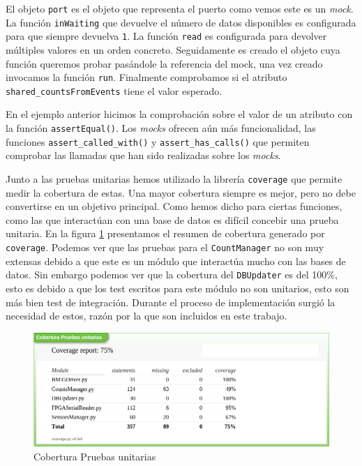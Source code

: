 	\par
	El objeto \texttt{port} es el objeto que representa el puerto como vemos este es un \emph{mock}. La función \texttt{inWaiting} que devuelve el
	número de datos disponibles es configurada para que siempre devuelva \texttt{1}. La función \texttt{read} es configurada para devolver
	múltiples valores en un orden concreto. Seguidamente es creado el objeto cuya función queremos probar pasándole la referencia del mock, una
	vez creado invocamos la función \texttt{run}. Finalmente comprobamos si el atributo \texttt{shared\_countsFromEvents} tiene el valor esperado.
	\par
	En el ejemplo anterior hicimos la comprobación sobre el valor de un atributo con la función \texttt{assertEqual()}. Los \emph{mocks} ofrecen
	aún más funcionalidad, las funciones \texttt{assert\_called\_with()} y \texttt{assert\_has\_calls()} que permiten comprobar las llamadas que
	han sido realizadas sobre los \emph{mocks}.
	\par
	Junto a las pruebas unitarias hemos utilizado la librería \texttt{coverage} que permite medir la cobertura de estas. Una mayor cobertura
	siempre es mejor, pero no debe convertirse en un objetivo principal. Como hemos dicho para ciertas funciones, como las que interactúan con una
	base de datos es difícil concebir una prueba unitaria. En la figura \ref{fig:coverage} presentamos el resumen de cobertura generado por
	\texttt{coverage}. Podemos ver que las pruebas para el \texttt{CountManager} no son muy extensas debido a que este es un módulo que interactúa
	mucho con las bases de datos. Sin embargo podemos ver que la cobertura del \texttt{DBUpdater} es del 100\%, esto es debido a que los test
	escritos para este módulo no son unitarios, esto son más bien test de integración. Durante el proceso de implementación surgió la necesidad de
	estos, razón por la que son incluidos en este trabajo.
	\begin{figure}[h]
		\centering
		\includegraphics[keepaspectratio, width=1\textwidth]{./img/coverage.png}
		\caption{Cobertura Pruebas unitarias}   
		\label{fig:coverage}
	\end{figure}
